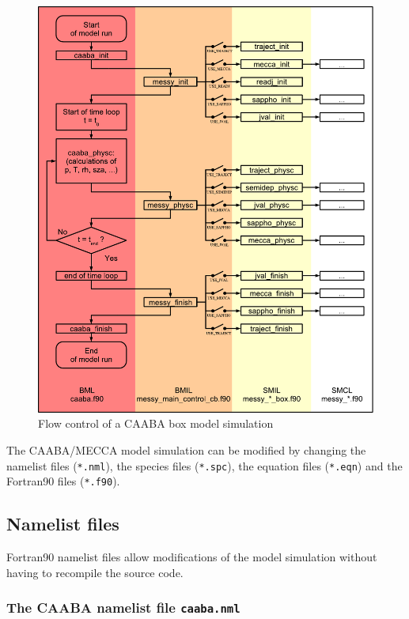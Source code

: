 \documentclass[twoside]{article}
\begin{document}
\begin{figure}%
  \begin{center}
  \includegraphics[width=\textwidth]{caaba_flowcontrol}
  \end{center}
  \caption{Flow control of a CAABA box model simulation}
  \label{fig:caaba_flowcontrol}
\end{figure}

The CAABA/MECCA model simulation can be modified by changing the
namelist files (\verb|*.nml|), the species files (\verb|*.spc|), the
equation files (\verb|*.eqn|) and the Fortran90 files (\verb|*.f90|).

\subsection{Namelist files}
\label{sec:nmlfiles}

Fortran90 namelist files allow modifications of the model simulation
without having to recompile the source code.

\subsubsection{The CAABA namelist file {\tt caaba.nml}}
\label{sec:caaba_nml}
\end{document}

